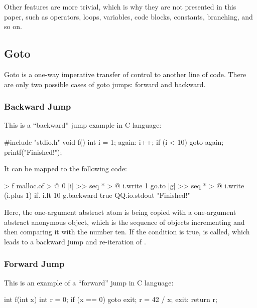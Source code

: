 \documentclass[sigplan,nonacm]{acmart}
\begin{document}
Other features are more trivial, which is why they are not presented in this paper, such as operators, loops, variables, code blocks, constants, branching, and so on.

\subsection{Goto}
\label{sec:goto}

Goto is a one-way imperative transfer of control to another line of code. There are only two possible cases of goto jumps: forward and backward.

\subsubsection{Backward Jump}

This is a ``backward'' jump example in C language:

\begin{ffcode}
#include "stdio.h"
void f() {
  int i = 1;
  again:
  i++;
  if (i < 10) goto again;
  printf("Finished!");
}
\end{ffcode}

It can be mapped to the following \eolang{} code:

\begin{ffcode}
[] > f
  malloc.of > @
    0
    [i] >>
      seq * > @
        i.write 1
        go.to
          [g] >>
            seq * > @
              i.write (i.plus 1)
              if.
                i.lt 10
                g.backward
                true
        QQ.io.stdout "Finished!"
\end{ffcode}

Here, the one-argument abstract atom  is being copied with a one-argument abstract anonymous object, which is the sequence of objects incrementing  and then comparing it with the number ten. If the condition is true,  is called, which leads to a backward jump and re-iteration of .

\subsubsection{Forward Jump}

This is an example of a ``forward'' jump in C language:

\begin{ffcode}
int f(int x) {
  int r = 0;
  if (x == 0) goto exit;
  r = 42 / x;
  exit:
  return r;
}
\end{ffcode}
\end{document}
